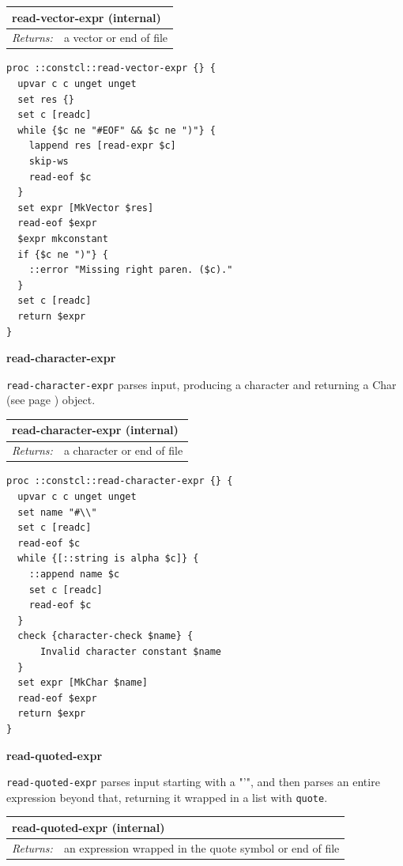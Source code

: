\documentclass[twoside,9pt]{report}
\begin{document}
\begin{tabular}{ |l l| }
\hline
\multicolumn{2}{|l|}{read-vector-expr (internal)} \\
\hline
\textit{Returns:} & a vector or end of file \\
\hline
\end{tabular}

\noindent\makebox[\linewidth]{\rule{\linewidth}{0.4pt}}
\begin{lstlisting}
proc ::constcl::read-vector-expr {} {
  upvar c c unget unget
  set res {}
  set c [readc]
  while {$c ne "#EOF" && $c ne ")"} {
    lappend res [read-expr $c]
    skip-ws
    read-eof $c
  }
  set expr [MkVector $res]
  read-eof $expr
  $expr mkconstant
  if {$c ne ")"} {
    ::error "Missing right paren. ($c)."
  }
  set c [readc]
  return $expr
}
\end{lstlisting}
\noindent\makebox[\linewidth]{\rule{\linewidth}{0.4pt}}

\textbf{read-character-expr}


\texttt{read-character-expr} parses input, producing a character and returning a Char (see page \pageref{characters}) object.

\begin{tabular}{ |l l| }
\hline
\multicolumn{2}{|l|}{read-character-expr (internal)} \\
\hline
\textit{Returns:} & a character or end of file \\
\hline
\end{tabular}

\noindent\makebox[\linewidth]{\rule{\linewidth}{0.4pt}}
\begin{lstlisting}
proc ::constcl::read-character-expr {} {
  upvar c c unget unget
  set name "#\\"
  set c [readc]
  read-eof $c
  while {[::string is alpha $c]} {
    ::append name $c
    set c [readc]
    read-eof $c
  }
  check {character-check $name} {
      Invalid character constant $name
  }
  set expr [MkChar $name]
  read-eof $expr
  return $expr
}
\end{lstlisting}
\noindent\makebox[\linewidth]{\rule{\linewidth}{0.4pt}}

\textbf{read-quoted-expr}


\texttt{read-quoted-expr} parses input starting with a "'", and then parses an entire expression beyond that, returning it wrapped in a list with \texttt{quote}.

\begin{tabular}{ |l l| }
\hline
\multicolumn{2}{|l|}{read-quoted-expr (internal)} \\
\hline
\textit{Returns:} & an expression wrapped in the quote symbol or end of file \\
\hline
\end{tabular}
\end{document}
